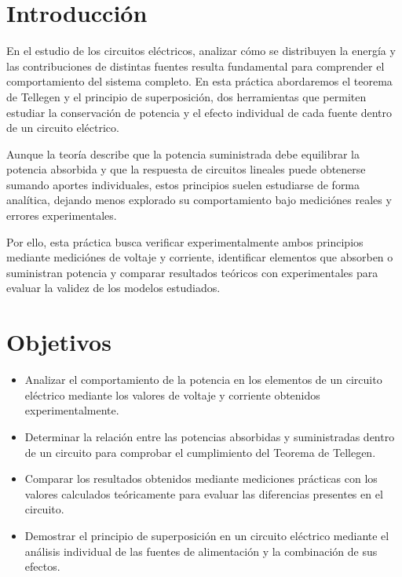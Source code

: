 \documentclass{article}
\begin{document}
    \section{Introducción}

    En el estudio de los circuitos eléctricos, analizar cómo se distribuyen la energía y las contribuciones de distintas fuentes resulta fundamental para comprender el comportamiento del sistema completo. En esta práctica abordaremos el teorema de Tellegen y el principio de superposición, dos herramientas que permiten estudiar la conservación de potencia y el efecto individual de cada fuente dentro de un circuito eléctrico.

    Aunque la teoría describe que la potencia suministrada debe equilibrar la potencia absorbida y que la respuesta de circuitos lineales puede obtenerse sumando aportes individuales, estos principios suelen estudiarse de forma analítica, dejando menos explorado su comportamiento bajo mediciónes reales y errores experimentales.

    Por ello, esta práctica busca verificar experimentalmente ambos principios mediante mediciónes de voltaje y corriente, identificar elementos que absorben o suministran potencia y comparar resultados teóricos con experimentales para evaluar la validez de los modelos estudiados.


    \section{Objetivos}

    \begin{itemize}
        \item Analizar el comportamiento de la potencia en los elementos de un circuito eléctrico mediante los valores de voltaje y corriente obtenidos experimentalmente.
        \item Determinar la relación entre las potencias absorbidas y suministradas dentro de un circuito para comprobar el cumplimiento del Teorema de Tellegen.
        \item Comparar los resultados obtenidos mediante mediciones prácticas con los valores calculados teóricamente para evaluar las diferencias presentes en el circuito.
        \item Demostrar el principio de superposición en un circuito eléctrico mediante el análisis individual de las fuentes de alimentación y la combinación de sus efectos.

    \end{itemize}
\end{document}
